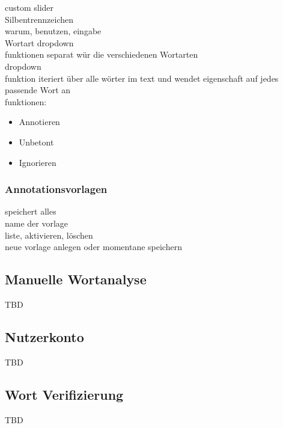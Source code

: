 custom slider\\

Silbentrennzeichen\\
warum, benutzen, eingabe\\

Wortart dropdown\\
funktionen separat wür die verschiedenen Wortarten\\
dropdown\\
funktion iteriert über alle wörter im text und wendet eigenschaft auf jedes passende Wort an\\
funktionen:\\
\begin{itemize}
	\item Annotieren
	\item Unbetont
	\item Ignorieren
\end{itemize}

\subsubsection{Annotationsvorlagen}

speichert alles\\
name der vorlage\\
liste, aktivieren, löschen\\
neue vorlage anlegen oder momentane speichern\\

\subsection{Manuelle Wortanalyse}

TBD

\subsection{Nutzerkonto}

TBD

\subsection{Wort Verifizierung}

TBD